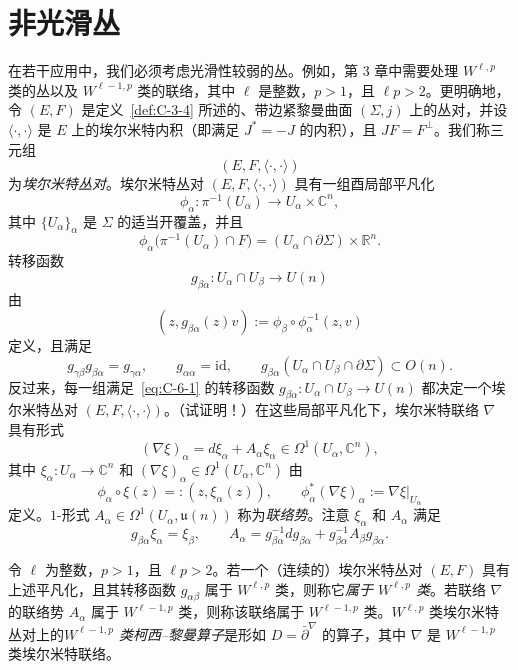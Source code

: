 
\section{非光滑丛}\label{sec:C-6}

在若干应用中，我们必须考虑光滑性较弱的丛。例如，第 3 章中需要处理 $W^{\ell,p}$ 类的丛以及 $W^{\ell-1,p}$ 类的联络，其中 $\ell$ 是整数，$p>1$，且 $\ell p>2$。更明确地，令 $(E,F)$ 是定义~\ref{def:C-3-4} 所述的、带边紧黎曼曲面 $(\Sigma,j)$ 上的丛对，并设 $\langle\cdot,\cdot\rangle$ 是 $E$ 上的埃尔米特内积（即满足 $J^*=-J$ 的内积），且 $JF=F^\perp$。我们称三元组
\[
  (E,F,\langle\cdot,\cdot\rangle)
\]
为\emph{埃尔米特丛对}。埃尔米特丛对 $(E,F,\langle\cdot,\cdot\rangle)$ 具有一组酉局部平凡化
\[
  \phi_\alpha:\pi^{-1}(U_\alpha)\longrightarrow U_\alpha\times\mathbb C^n,
\]
其中 $\{U_\alpha\}_\alpha$ 是 $\Sigma$ 的适当开覆盖，并且
\[
  \phi_\alpha\bigl(\pi^{-1}(U_\alpha)\cap F\bigr)
  =(U_\alpha\cap\partial\Sigma)\times\mathbb R^n.
\]
转移函数
\[
  g_{\beta\alpha}:U_\alpha\cap U_\beta\longrightarrow U(n)
\]
由
\[
  (z,g_{\beta\alpha}(z)v):=\phi_\beta\circ\phi_\alpha^{-1}(z,v)
\]
定义，且满足
\begin{equation}\label{eq:C-6-1}
  g_{\gamma\beta}g_{\beta\alpha}=g_{\gamma\alpha},\qquad
  g_{\alpha\alpha}=\mathrm{id},\qquad
  g_{\beta\alpha}(U_\alpha\cap U_\beta\cap\partial\Sigma)\subset O(n).
\end{equation}
反过来，每一组满足~\eqref{eq:C-6-1} 的转移函数 $g_{\beta\alpha}:U_\alpha\cap U_\beta\to U(n)$ 都决定一个埃尔米特丛对 $(E,F,\langle\cdot,\cdot\rangle)$。（试证明！）在这些局部平凡化下，埃尔米特联络 $\nabla$ 具有形式
\[
  (\nabla\xi)_\alpha=d\xi_\alpha+A_\alpha\xi_\alpha
  \in\Omega^1(U_\alpha,\mathbb C^n),
\]
其中 $\xi_\alpha:U_\alpha\to\mathbb C^n$ 和 $(\nabla\xi)_\alpha\in\Omega^1(U_\alpha,\mathbb C^n)$ 由
\[
  \phi_\alpha\circ\xi(z)=:(z,\xi_\alpha(z)),\qquad
  \phi_\alpha^*(\nabla\xi)_\alpha:=\nabla\xi|_{U_\alpha}
\]
定义。$1$-形式 $A_\alpha\in\Omega^1(U_\alpha,\mathfrak u(n))$ 称为\emph{联络势}。注意 $\xi_\alpha$ 和 $A_\alpha$ 满足
\[
  g_{\beta\alpha}\xi_\alpha=\xi_\beta,\qquad
  A_\alpha=g_{\beta\alpha}^{-1}dg_{\beta\alpha}
    +g_{\beta\alpha}^{-1}A_\beta g_{\beta\alpha}.
\]

\begin{definition}\label{def:C-6-1}
令 $\ell$ 为整数，$p>1$，且 $\ell p>2$。若一个（连续的）埃尔米特丛对 $(E,F)$ 具有上述平凡化，且其转移函数 $g_{\alpha\beta}$ 属于 $W^{\ell,p}$ 类，则称它\emph{属于 $W^{\ell,p}$ 类}。若联络 $\nabla$ 的联络势 $A_\alpha$ 属于 $W^{\ell-1,p}$ 类，则称该联络属于 $W^{\ell-1,p}$ 类。$W^{\ell,p}$ 类埃尔米特丛对上的\emph{$W^{\ell-1,p}$ 类柯西--黎曼算子}是形如 $D=\bar\partial^\nabla$ 的算子，其中 $\nabla$ 是 $W^{\ell-1,p}$ 类埃尔米特联络。
\end{definition}

